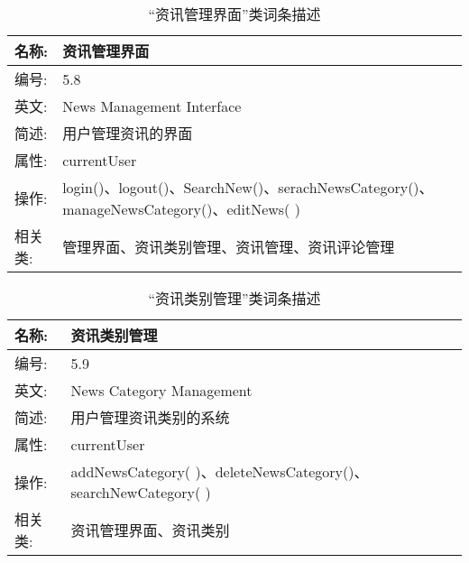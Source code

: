 \begin{table}[H]  
\caption{“资讯管理界面”类词条描述}  
\begin{center}  
    \begin{tabular}{l p{11cm}} 
        \hline
        \quad 名称:  & 资讯管理界面 \\
        \hline
        \quad 编号:  & 5.8 \\
        \hline
        \quad 英文:  &  News Management Interface \\
        \hline
        \quad 简述:  & 用户管理资讯的界面 \\
        \hline
        \quad 属性:  & currentUser \\
        \hline
        \quad 操作:  & login()、logout()、SearchNew()、serachNewsCategory()、manageNewsCategory()、editNews( )\\
        \hline
        \quad 相关类: & 管理界面、资讯类别管理、资讯管理、资讯评论管理\\
        \hline
    \end{tabular}
\end{center}
\end{table}

\begin{table}[H]  
\caption{“资讯类别管理”类词条描述}  
\begin{center}  
    \begin{tabular}{l p{11cm}} 
        \hline
        \quad 名称:  & 资讯类别管理 \\
        \hline
        \quad 编号:  & 5.9 \\
        \hline
        \quad 英文:  &  News Category Management\\
        \hline
        \quad 简述:  & 用户管理资讯类别的系统 \\
        \hline
        \quad 属性:  & currentUser \\
        \hline
        \quad 操作:  & addNewsCategory( )、deleteNewsCategory()、searchNewCategory( )\\
        \hline
        \quad 相关类: & 资讯管理界面、资讯类别\\
        \hline
    \end{tabular}
\end{center}
\end{table}

